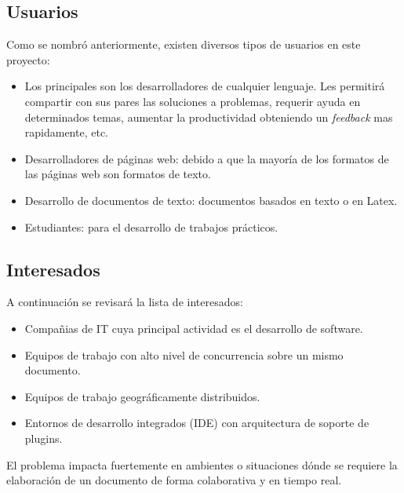 \documentclass[a4paper,11pt]{article}
\begin{document}
		\subsection{Usuarios}
		    Como se nombr\'o anteriormente, existen diversos tipos de usuarios en este proyecto:

		    \begin{itemize}
				\item 	Los principales son los desarrolladores de cualquier lenguaje. Les permitir\'a
						compartir con sus pares las soluciones a problemas, requerir ayuda en
						determinados temas, aumentar la productividad obteniendo un \textit{feedback} mas
						rapidamente, etc.

				\item 	Desarrolladores de p\'aginas web: debido a que la mayor\'ia de los formatos
						de las páginas web son formatos de texto.

				\item	Desarrollo de documentos de texto: documentos basados en texto o en Latex.

				\item	Estudiantes: para el desarrollo de trabajos prácticos.

		    \end{itemize}

		\subsection{Interesados}
		    A continuaci\'on se revisar\'a la lista de interesados:

		    \begin{itemize}
				\item 	Compa\~nias de IT cuya principal actividad es el desarrollo de software.

				\item 	Equipos de trabajo con alto nivel de concurrencia sobre un mismo documento.

				\item 	Equipos de trabajo geogr\'aficamente distribuidos.

				\item	Entornos de desarrollo integrados (IDE) con arquitectura de soporte de plugins.
		    \end{itemize}

		    El problema impacta fuertemente en ambientes o situaciones d\'onde se requiere
		    la elaboraci\'on de un documento de forma colaborativa y en tiempo real.
\end{document}
